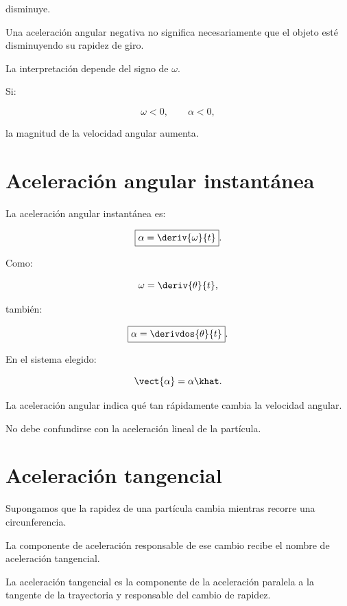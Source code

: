 disminuye.

\begin{advertencia}

Una aceleración angular negativa no significa necesariamente que el objeto
esté disminuyendo su rapidez de giro.

La interpretación depende del signo de \(\omega\).

Si:

\[
\omega<0,
\qquad
\alpha<0,
\]

la magnitud de la velocidad angular aumenta.

\end{advertencia}


\section{Aceleración angular instantánea}

\begin{definicion}

La aceleración angular instantánea es:

\[
\boxed{
\alpha
=
\deriv{\omega}{t}
}.
\]

Como:

\[
\omega=\deriv{\theta}{t},
\]

también:

\[
\boxed{
\alpha=\derivdos{\theta}{t}
}.
\]

\end{definicion}

En el sistema elegido:

\[
\vect{\alpha}
=
\alpha\khat.
\]

La aceleración angular indica qué tan rápidamente cambia la velocidad angular.

No debe confundirse con la aceleración lineal de la partícula.


\section{Aceleración tangencial}

Supongamos que la rapidez de una partícula cambia mientras recorre una
circunferencia.

La componente de aceleración responsable de ese cambio recibe el nombre de
aceleración tangencial.

\begin{definicion}

La aceleración tangencial es la componente de la aceleración paralela a la
tangente de la trayectoria y responsable del cambio de rapidez.

\end{definicion}

